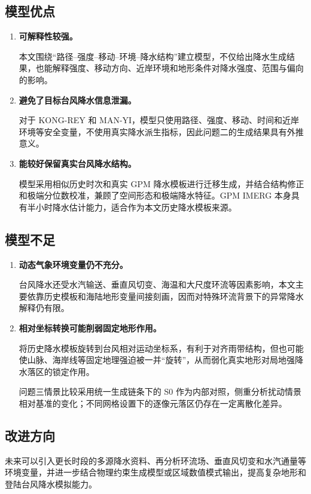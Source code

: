 \documentclass[UTF8,a4paper,zihao=5,fontset=fandol]{ctexart}
\numberwithin{equation}{section}
\numberwithin{figure}{section}
\numberwithin{table}{section}
\begin{document}
\subsection{模型优点}
\begin{enumerate}
  \item \textbf{可解释性较强。}

  本文围绕“路径--强度--移动--环境--降水结构”建立模型，不仅给出降水生成结果，也能解释强度、移动方向、近岸环境和地形条件对降水强度、范围与偏向的影响。

  \item \textbf{避免了目标台风降水信息泄漏。}

  对于 KONG-REY 和 MAN-YI，模型只使用路径、强度、移动、时间和近岸环境等安全变量，不使用真实降水派生指标，因此问题二的生成结果具有外推意义。

  \item \textbf{能较好保留真实台风降水结构。}

  模型采用相似历史时次和真实 GPM 降水模板进行迁移生成，并结合结构修正和极端分位数校准，兼顾了空间形态和极端降水特征。GPM IMERG 本身具有半小时降水估计能力，适合作为本文历史降水模板来源\cite{ref2}。
\end{enumerate}

\subsection{模型不足}
\begin{enumerate}
  \item \textbf{动态气象环境变量仍不充分。}

  台风降水还受水汽输送、垂直风切变、海温和大尺度环流等因素影响，本文主要依靠历史模板和海陆地形变量间接刻画，因而对特殊环流背景下的异常降水解释仍有限。

  \item \textbf{相对坐标转换可能削弱固定地形作用。}

  将历史降水模板旋转到台风相对运动坐标系，有利于对齐雨带结构，但也可能使山脉、海岸线等固定地理强迫被一并“旋转”，从而弱化真实地形对局地强降水落区的锁定作用。

  问题三情景比较采用统一生成链条下的 S0 作为内部对照，侧重分析扰动情景相对基准的变化；不同网格设置下的逐像元落区仍存在一定离散化差异。
\end{enumerate}

\subsection{改进方向}
未来可以引入更长时段的多源降水资料、再分析环流场、垂直风切变和水汽通量等环境变量，并进一步结合物理约束生成模型或区域数值模式输出，提高复杂地形和登陆台风降水模拟能力。
\end{document}
